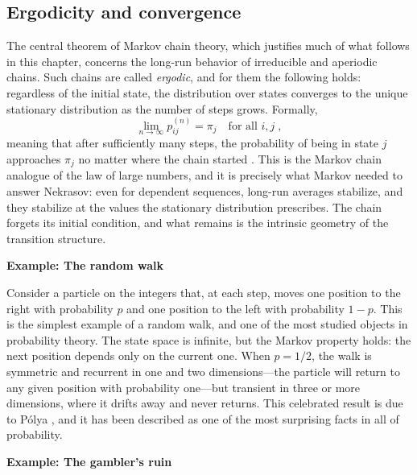 \subsection*{Ergodicity and convergence}

The central theorem of Markov chain theory, which justifies much of what follows in this chapter, concerns the long-run behavior of irreducible and aperiodic chains. Such chains are called \textit{ergodic}, and for them the following holds: regardless of the initial state, the distribution over states converges to the unique stationary distribution as the number of steps grows. Formally,
\begin{equation}
    \lim_{n \to \infty} p_{ij}^{(n)} = \pi_j \quad \text{for all } i, j \; ,
\end{equation}
meaning that after sufficiently many steps, the probability of being in state $j$ approaches $\pi_j$ no matter where the chain started \cite{norris_1997_markov}. This is the Markov chain analogue of the law of large numbers, and it is precisely what Markov needed to answer Nekrasov: even for dependent sequences, long-run averages stabilize, and they stabilize at the values the stationary distribution prescribes. The chain forgets its initial condition, and what remains is the intrinsic geometry of the transition structure.

\medskip

\textbf{Example: The random walk}

\medskip

Consider a particle on the integers that, at each step, moves one position to the right with probability $p$ and one position to the left with probability $1-p$. This is the simplest example of a random walk, and one of the most studied objects in probability theory. The state space is infinite, but the Markov property holds: the next position depends only on the current one. When $p = 1/2$, the walk is symmetric and recurrent in one and two dimensions---the particle will return to any given position with probability one---but transient in three or more dimensions, where it drifts away and never returns. This celebrated result is due to Pólya \cite{polya_1921_randomwalk}, and it has been described as one of the most surprising facts in all of probability.

\medskip

\textbf{Example: The gambler's ruin}

